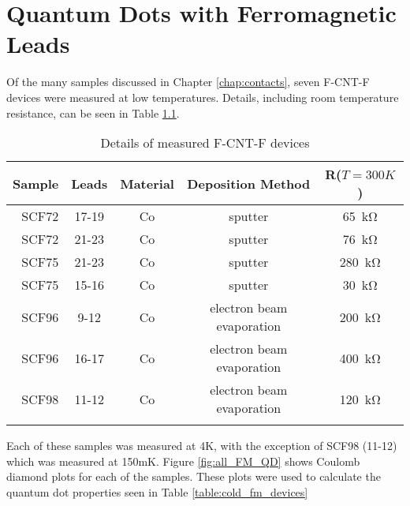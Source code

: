 \chapter{Quantum Dots with Ferromagnetic Leads}
\label{sec:FMCNTQD}

Of the many samples discussed in Chapter \ref{chap:contacts}, seven F-CNT-F devices were measured at low temperatures. Details, including room temperature resistance, can be seen in Table \ref{table:rt_fm_devices}.

\begin{table}
    \centering
    \footnotesize
    \begin{tabular}{ r | c | c c c}
        Sample & Leads & Material & Deposition Method & R($T=300K$) \\ \hline
        SCF72 & 17-19 & Co & sputter & \SI{65}{\kilo\ohm} \\
        SCF72 & 21-23 & Co & sputter & \SI{76}{\kilo\ohm}\\
        SCF75 & 21-23 & Co & sputter & \SI{280}{\kilo\ohm}\\
        SCF75 & 15-16 & Co & sputter & \SI{30}{\kilo\ohm}\\
        SCF96 & 9-12  & Co & electron beam evaporation & \SI{200}{\kilo\ohm}\\
        SCF96 & 16-17 & Co & electron beam evaporation & \SI{400}{\kilo\ohm}\\
        SCF98 & 11-12 & Co & electron beam evaporation & \SI{120}{\kilo\ohm}\\
        \label{table:rt_fm_devices}  
    \end{tabular}
    \caption{Details of measured F-CNT-F devices}
\end{table}

Each of these samples was measured at 4K, with the exception of SCF98 (11-12) which was measured at 150mK. Figure \ref{fig:all_FM_QD} shows Coulomb diamond plots for each of the samples. These plots were used to calculate the quantum dot properties seen in Table \ref{table:cold_fm_devices}

